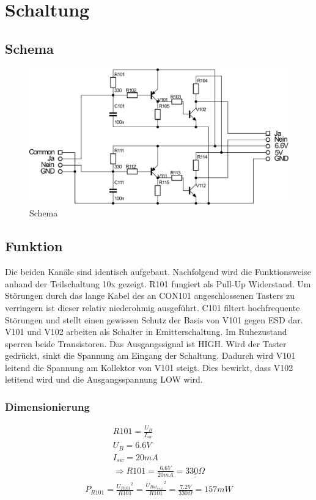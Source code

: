 
\section{Schaltung}

\subsection{Schema}
\begin{figure}[h!]
	\centering
	\includegraphics[scale=\schscale]{fig/xlr_pegelwandler_v_1_2_sch.pdf}
	\caption{Schema}
	\label{sch:pegw}
\end{figure}

\subsection{Funktion}
Die beiden Kanäle sind identisch aufgebaut. Nachfolgend wird die Funktionsweise anhand der Teilschaltung 10x gezeigt. R101 fungiert als Pull-Up Widerstand. Um Störungen durch das lange Kabel des an CON101 angeschlossenen Tasters zu verringern ist dieser relativ niederohmig ausgeführt. C101 filtert hochfrequente Störungen und stellt einen gewissen Schutz der Basis von V101 gegen ESD dar. V101 und V102 arbeiten als Schalter in Emitterschaltung. Im Ruhezustand sperren beide Transistoren. Das Ausgangssignal ist HIGH. Wird der Taster gedrückt, sinkt die Spannung am Eingang der Schaltung. Dadurch wird V101 leitend die Spannung am Kollektor von V101 steigt. Dies bewirkt, dass V102 letitend wird und die Ausgangsspannung LOW wird. 

\subsubsection{Dimensionierung}
\[ \begin{array}{l}
R101 = \frac{U_B}{I_{sw}}\\
U_B = 6.6 V\\
I_{sw} = 20 mA\\
\Rightarrow R101 = \frac{6.6V}{20mA} = \underline{\underline{330 \Omega}}
\end{array} \]
%
\[ \begin{array}{l}
P_{R101} = \frac{{U_{R101}}^2}{R101} = \frac{{U_{Bat_{max}}}^2}{R101} = \frac{7.2 V}{330 \Omega} = 157 mW
\end{array} \]

